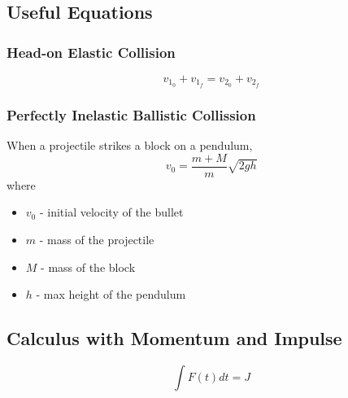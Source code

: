 \documentclass[titlepage]{article}
\begin{document}
\subsection{Useful Equations}
\subsubsection{Head-on Elastic Collision}
\begin{equation*}
    v_{1_0} + v_{1_f} = v_{2_0} + v_{2_f}
\end{equation*}

\subsubsection{Perfectly Inelastic Ballistic Collission}
When a projectile strikes a block on a pendulum,
\begin{equation*}
    v_0 = \frac{m + M}{m}\sqrt{2gh}
\end{equation*}
where
\begin{itemize}
    \item $v_0$ - initial velocity of the bullet
    \item $m$ - mass of the projectile
    \item $M$ - mass of the block
    \item $h$ - max height of the pendulum
\end{itemize}

\subsection{Calculus with Momentum and Impulse}
\begin{equation*}
    \int F(t) dt = J
\end{equation*}
\end{document}
